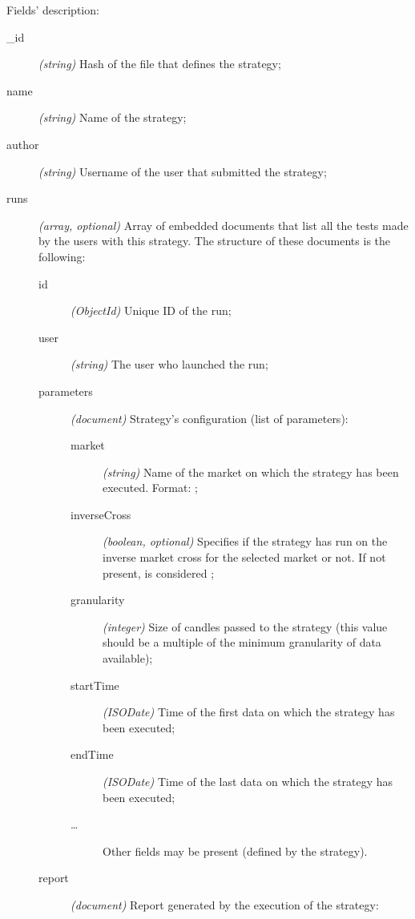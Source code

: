 Fields' description:
\begin{description}
	\item[\_id] \textit{(string)} Hash of the file that defines the
		strategy;
	\item[name] \textit{(string)} Name of the strategy;
	\item[author] \textit{(string)} Username of the user that submitted the
		strategy;
	\item[runs] \textit{(array, optional)} Array of embedded documents that
		list all the tests made by the users with this strategy. The
		structure of these documents is the following:
		\begin{description}
			\item[id] \textit{(ObjectId)} Unique ID of the run;
			\item[user] \textit{(string)} The user who launched the
				run;
			\item[parameters] \textit{(document)} Strategy's
				configuration (list of parameters):
				\begin{description}
					\item[market] \textit{(string)} Name of
						the market on which the strategy
						has been executed. Format:
						;
					\item[inverseCross] \textit{(boolean,
						optional)} Specifies if the
						strategy has run on the inverse
						market cross for the selected
						market or not. If not present,
						is considered ;
					\item[granularity] \textit{(integer)}
						Size of candles passed to the
						strategy (this value should be a
						multiple of the minimum
						granularity of data available);
					\item[startTime]
						\textit{(ISODate)} Time of the
						first data on which the strategy
						has been executed;
					\item[endTime]
						\textit{(ISODate)} Time of the
						last data on which the strategy
						has been executed;
					\item[\ldots] Other fields may be
						present (defined by the
						strategy).
				\end{description}
			\item[report] \textit{(document)} Report generated by
				the execution of the strategy:
				\begin{description}
					\item[netProfit] \textit{(numeric)} The
						profit (\(\interval[open

\end{description}
\end{description}
\end{description}
